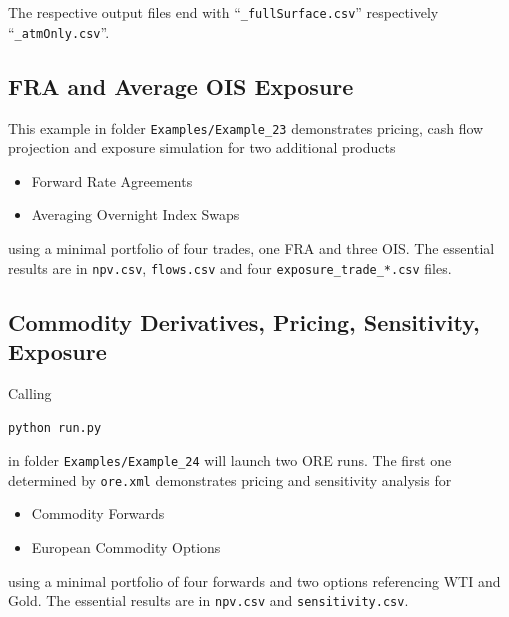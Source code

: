 The respective output files end with ``{\tt\_fullSurface.csv}'' respectively ``{\tt\_atmOnly.csv}''.



\subsection{FRA and Average OIS Exposure}%

This example in folder {\tt Examples/Example\_23} demonstrates pricing, cash flow projection and exposure simulation for two additional products
\begin{itemize}
\item Forward Rate Agreements
\item Averaging Overnight Index Swaps
\end{itemize}
using a minimal portfolio of four trades, one FRA and three OIS. The essential results are in {\tt npv.csv}, {\tt flows.csv} and
four {\tt exposure\_trade\_*.csv} files.

\subsection{Commodity Derivatives, Pricing, Sensitivity, Exposure}%
\label{example:24}

Calling

\medskip
\centerline{\tt python run.py}

\medskip
in folder {\tt Examples/Example\_24} will launch two ORE runs. The first one determined by {\tt ore.xml} demonstrates pricing and sensitivity analysis for
\begin{itemize}
\item Commodity Forwards
\item European Commodity Options
\end{itemize}
using a minimal portfolio of four forwards and two options referencing WTI and Gold.
The essential results are in {\tt npv.csv} and {\tt sensitivity.csv}.


